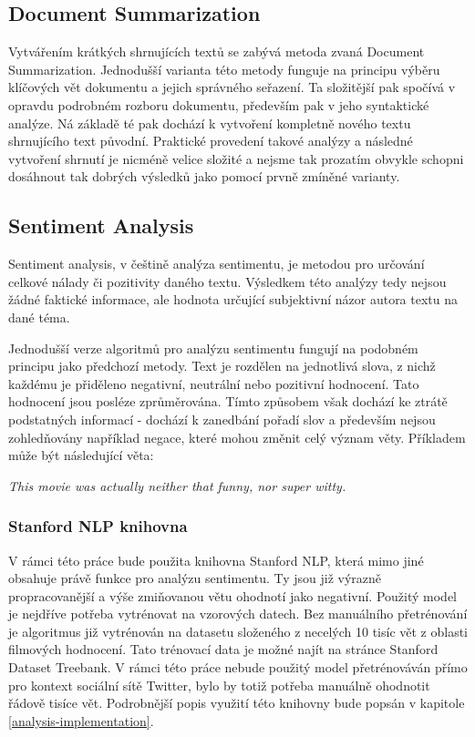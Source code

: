 \documentclass[thesis=B,czech]{FITthesis}[2012/06/26]
\begin{document}
\subsection{Document Summarization}
	Vytvářením krátkých shrnujících textů se zabývá metoda zvaná Document Summarization. Jednodušší varianta této metody funguje na principu výběru klíčových vět dokumentu a jejich správného seřazení. Ta složitější pak spočívá v opravdu podrobném rozboru dokumentu, především pak v jeho syntaktické analýze. Ná základě té pak dochází k vytvoření kompletně nového textu shrnujícího text původní. Praktické provedení takové analýzy a následné vytvoření shrnutí je nicméně velice složité a nejsme tak prozatím obvykle schopni dosáhnout tak dobrých výsledků jako pomocí prvně zmíněné varianty\cite{aaaa}. 


\subsection{Sentiment Analysis}
\label{sentiment-analysis}
	Sentiment analysis, v češtině analýza sentimentu, je metodou pro určování celkové nálady či pozitivity daného textu. Výsledkem této analýzy tedy nejsou žádné faktické informace, ale hodnota určující subjektivní názor autora textu na dané téma. 
	
	Jednodušší verze algoritmů pro analýzu sentimentu fungují na podobném principu jako předchozí metody. Text je rozdělen na jednotlivá slova, z nichž každému je přiděleno negativní, neutrální nebo pozitivní hodnocení. Tato hodnocení jsou posléze zprůměrována. Tímto způsobem však dochází ke ztrátě podstatných informací - dochází k zanedbání pořadí slov a především nejsou zohledňovány například negace, které mohou změnit celý význam věty. Příkladem může být následující věta:

\textit{This movie was actually neither that funny, nor super witty.}	

\subsubsection{Stanford NLP knihovna}

	V rámci této práce bude použita knihovna Stanford NLP\cite{sssss}, která mimo jiné obsahuje právě funkce pro analýzu sentimentu. Ty jsou již výrazně propracovanější a výše zmiňovanou větu ohodnotí jako negativní. Použitý model je nejdříve potřeba vytrénovat na vzorových datech. Bez manuálního přetrénování je algoritmus již vytrénován na datasetu složeného z necelých 10 tisíc vět z oblasti filmových hodnocení. Tato trénovací data je možné najít na stránce Stanford Dataset Treebank\cite{ssdassa}. V rámci této práce nebude použitý model přetrénováván přímo pro kontext sociální sítě Twitter, bylo by totiž potřeba manuálně ohodnotit řádově tisíce vět. Podrobnější popis využití této knihovny bude popsán v kapitole \ref{analysis-implementation}. 
\end{document}

